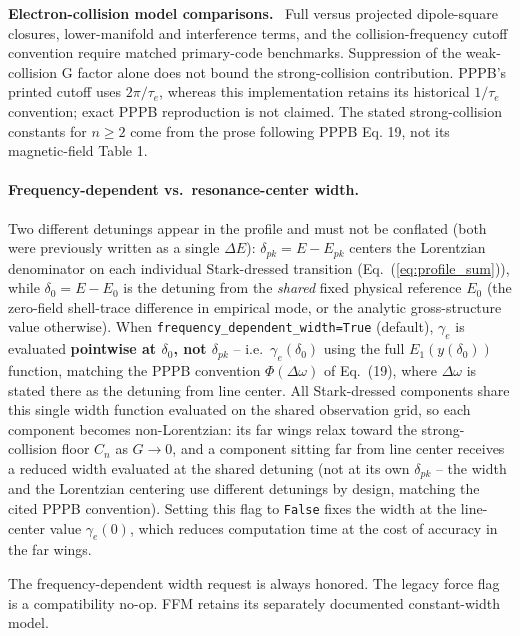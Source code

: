 \documentclass[11pt,a4paper]{article}
\newenvironment{caveat}[1][Caveat]{%
  \par\smallskip\noindent\begin{lrbox}{\notebox}\setlength{\fboxsep}{6pt}\begin{minipage}{\dimexpr\linewidth-2\fboxsep-2\fboxrule\relax}\small\textbf{#1.}\ }{%
  \end{minipage}\end{lrbox}\setlength{\fboxsep}{6pt}\fcolorbox{warnframe}{warnbg}{\usebox{\notebox}}\par\smallskip}
\numberwithin{equation}{section}
\begin{document}
\begin{caveat}[Electron-collision model comparisons]
Full versus projected dipole-square closures, lower-manifold and interference
terms, and the collision-frequency cutoff convention require matched primary-code
benchmarks. Suppression of the weak-collision G factor alone does not bound the
strong-collision contribution. PPPB's printed cutoff uses $2\pi/\tau_e$, whereas
this implementation retains its historical $1/\tau_e$ convention; exact PPPB
reproduction is not claimed. The stated strong-collision constants for $n\ge2$
come from the prose following PPPB Eq. 19, not its magnetic-field Table 1.
\end{caveat}

\paragraph{Frequency-dependent vs.\ resonance-center width.}
Two different detunings appear in the profile and must not be conflated (both were previously written
as a single $\Delta E$): $\delta_{pk} = E - E_{pk}$ centers the Lorentzian denominator on each individual
Stark-dressed transition (Eq.~(\ref{eq:profile_sum})), while $\delta_0 = E - E_0$ is the detuning from the
\emph{shared} fixed physical reference $E_0$ (the zero-field shell-trace
difference in empirical mode, or the analytic gross-structure value otherwise).
When \texttt{frequency\_dependent\_\allowbreak{}width=True}
(default), $\gamma_e$ is evaluated \textbf{pointwise at $\delta_0$, not $\delta_{pk}$} -- i.e.\ $\gamma_e(\delta_0)$
using the full $E_1(y(\delta_0))$ function, matching the PPPB convention $\Phi(\Delta\omega)$ of \cite{ferri}
Eq.~(19), where $\Delta\omega$ is stated there as the detuning from line center.  All Stark-dressed
components share this single width
function evaluated on the shared observation grid, so each component becomes non-Lorentzian: its far wings
relax toward the strong-collision floor $C_n$ as $G\to0$, and a component sitting far from line center
receives a reduced width evaluated at the shared detuning (not at its own $\delta_{pk}$ -- the width and
the Lorentzian centering use different detunings by design, matching the cited PPPB convention).
Setting this flag to \texttt{False} fixes the width at the line-center value $\gamma_e(0)$,
which reduces computation time at the cost of accuracy in the far wings.

The frequency-dependent width request is always honored. The legacy force flag is a compatibility no-op. FFM retains its separately documented constant-width model.
\end{document}
